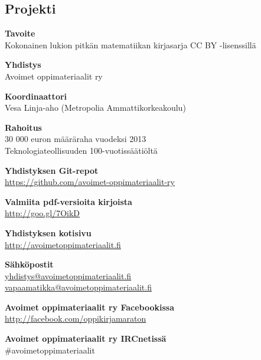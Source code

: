 \subsection*{Projekti}

\textbf{Tavoite} \\
Kokonainen lukion pitkän matematiikan kirjasarja CC BY -lisenssillä

\textbf{Yhdistys} \\
Avoimet oppimateriaalit ry

\textbf{Koordinaattori} \\
Vesa Linja-aho (Metropolia Ammattikorkeakoulu)

\textbf{Rahoitus} \\
30 000 euron määräraha vuodeksi 2013 \\
Teknologiateollisuuden 100-vuotissäätiöltä

\textbf{Yhdistyksen Git-repot} \\
\url{https://github.com/avoimet-oppimateriaalit-ry}

\textbf{Valmiita pdf-versioita kirjoista} \\
\url{http://goo.gl/7OikD}

\textbf{Yhdistyksen kotisivu} \\
\url{http://avoimetoppimateriaalit.fi}

\textbf{Sähköpostit} \\
\href{mailto:yhdistys@avoimetoppimateriaalit.fi}{yhdistys@avoimetoppimateriaalit.fi} \\
\href{mailto:vapaamatikka@avoimetoppimateriaalit.fi}{vapaamatikka@avoimetoppimateriaalit.fi}

\textbf{Avoimet oppimateriaalit ry Facebookissa} \\
\url{http://facebook.com/oppikirjamaraton}

\textbf{Avoimet oppimateriaalit ry IRCnetissä} \\
\#avoimetoppimateriaalit
